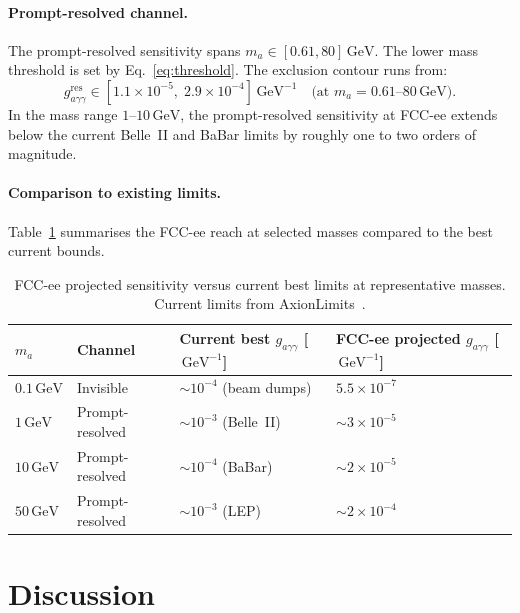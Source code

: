 \documentclass[12pt,a4paper]{article}
\newcommand{\alp}{a}
\newcommand{\gagg}{g_{a\gamma\gamma}}
\newcommand{\GeV}{\,\text{GeV}}
\begin{document}
\paragraph{Prompt-resolved channel.}
The prompt-resolved sensitivity spans $m_\alp \in [0.61, 80]\GeV$.
The lower mass threshold is set by Eq.~\eqref{eq:threshold}.
The exclusion contour runs from:
\begin{equation}
    \gagg^\mathrm{res} \in
    \left[1.1\times10^{-5},\; 2.9\times10^{-4}\right]\GeV^{-1}
    \quad \text{(at } m_\alp = 0.61\text{--}80\GeV\text{)}.
    \label{eq:res_result}
\end{equation}
In the mass range $1$--$10\GeV$, the prompt-resolved sensitivity at FCC-ee
extends below the current Belle~II and BaBar limits by roughly one to two orders
of magnitude.

\paragraph{Comparison to existing limits.}
Table~\ref{tab:comparison} summarises the FCC-ee reach at selected masses
compared to the best current bounds.

\begin{table}[h]
    \centering
    \caption{FCC-ee projected sensitivity versus current best limits at representative masses.
    Current limits from AxionLimits~\cite{AxionLimits}.}
    \label{tab:comparison}
    \begin{tabular}{llll}
        \toprule
        $m_\alp$ & Channel & Current best $\gagg$ [$\GeV^{-1}$] &
        FCC-ee projected $\gagg$ [$\GeV^{-1}$] \\
        \midrule
        $0.1\GeV$ & Invisible & $\sim10^{-4}$ (beam dumps) &
        $5.5\times10^{-7}$ \\
        $1\GeV$ & Prompt-resolved & $\sim10^{-3}$ (Belle~II) &
        $\sim3\times10^{-5}$ \\
        $10\GeV$ & Prompt-resolved & $\sim10^{-4}$ (BaBar) &
        $\sim2\times10^{-5}$ \\
        $50\GeV$ & Prompt-resolved & $\sim10^{-3}$ (LEP) &
        $\sim2\times10^{-4}$ \\
        \bottomrule
    \end{tabular}
\end{table}

\section{Discussion}
\label{sec:discussion}
\end{document}
